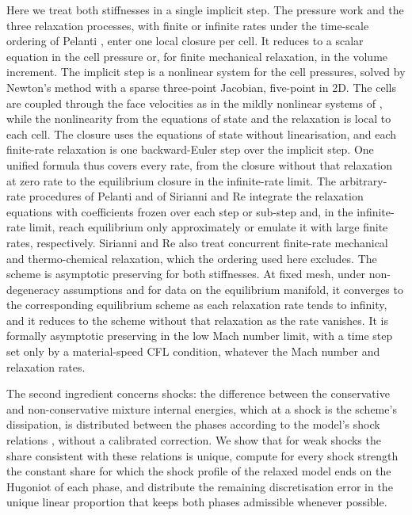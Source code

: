 Here we treat both stiffnesses in a single implicit step. The pressure work and the three relaxation processes, with
finite or infinite rates under the time-scale ordering of Pelanti \cite{Pelanti2022}, enter one local closure per cell.
It reduces to a scalar equation in the cell pressure or, for finite mechanical relaxation, in the volume increment. The
implicit step is a nonlinear system for the cell pressures, solved by Newton's method with a sparse three-point
Jacobian, five-point in 2D. The cells are coupled through the face velocities as in the mildly nonlinear systems of
\cite{DumbserCasulli2016,CasulliZanolli2012}, while the nonlinearity from the equations of state and the relaxation is
local to each cell. The closure uses the equations of state without linearisation, and each finite-rate relaxation is
one backward-Euler step over the implicit step. One unified formula thus covers every rate, from the closure without
that relaxation at zero rate to the equilibrium closure in the infinite-rate limit. The arbitrary-rate procedures of
Pelanti \cite{Pelanti2022} and of Sirianni and Re \cite{SirianniRe2026} integrate the relaxation equations with
coefficients frozen over each step or sub-step and, in the infinite-rate limit, reach equilibrium only approximately or
emulate it with large finite rates, respectively. Sirianni and Re also treat concurrent finite-rate mechanical and
thermo-chemical relaxation, which the ordering used here excludes. The scheme is asymptotic preserving for both
stiffnesses. At fixed mesh, under non-degeneracy assumptions and for data on the equilibrium manifold, it converges to
the corresponding equilibrium scheme as each relaxation rate tends to infinity, and it reduces to the scheme without
that relaxation as the rate vanishes. It is formally asymptotic preserving in the low Mach number limit, with a time
step set only by a material-speed CFL condition, whatever the Mach number and relaxation rates.

The second ingredient concerns shocks: the difference between the conservative and non-conservative mixture internal
energies, which at a shock is the scheme's dissipation, is distributed between the phases according to the model's shock
relations \cite{SaurelGavrilyukRenaud2003}, without a calibrated correction. We show that for weak shocks the share
consistent with these relations is unique, compute for every shock strength the constant share for which the shock
profile of the relaxed model ends on the Hugoniot of each phase, and distribute the remaining discretisation error in
the unique linear proportion that keeps both phases admissible whenever possible.

